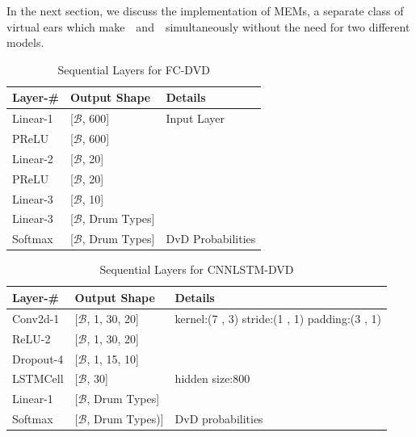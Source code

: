 \documentclass[\main/thesis.tex]{subfiles}
\begin{document}
In the next section, we discuss the implementation of MEMs, a separate class of virtual ears which make~\decfirst~and~\decsecond~simultaneously without the need for two different models.
\begin{center}
    \begin{table}[tbp]
    \centering
    \begin{tabular}{|p{33mm}|p{33mm}|p{40mm}|}
    \hline
    Layer-\# & Output Shape &  Details  \\ \hline
    Linear-1 & [$\mathcal{B}$, 600] &   Input Layer  \\ \hline
    PReLU & [$\mathcal{B}$, 600] &  \\ \hline
    Linear-2 & [$\mathcal{B}$, 20] & \\ \hline
    PReLU & [$\mathcal{B}$, 20] &  \\ \hline 
    Linear-3 & [$\mathcal{B}$, 10] &  \\ \hline %
    Linear-3 & [$\mathcal{B}$, Drum Types] &  \\ \hline 
    Softmax & [$\mathcal{B}$, Drum Types] &  DvD Probabilities\\ \hline
    \end{tabular}
    \caption{Sequential Layers for FC-DVD}
    \label{tab:dvdfc}
    \end{table}
\end{center}

\begin{center}
    \begin{table}[tbp]
    \centering
    \begin{tabular}{|p{28mm}|p{32mm}|p{40mm}|}
    \hline
    Layer-\# & Output Shape & Details  \\ \hline
    Conv2d-1 & [$\mathcal{B}$, 1, 30, 20]  &
    kernel:(7 , 3)\newline                  
    stride:(1 , 1)\newline    
    padding:(3 , 1) \\ \hline
    ReLU-2 & [$\mathcal{B}$, 1, 30, 20] & \\  \hline
    Dropout-4 & [$\mathcal{B}$, 1, 15, 10] &  \\ \hline
    LSTMCell  & [$\mathcal{B}$, 30] & hidden size:800 \\ \hline
    Linear-1 & [$\mathcal{B}$, Drum Types] &  \\ \hline 
    Softmax & [$\mathcal{B}$, Drum Types)] &  DvD probabilities \\ \hline
    \end{tabular}
    \caption{Sequential Layers for CNNLSTM-DVD }
    \label{tab:dvdcnn}
    \end{table} 
\end{center}
\end{document}
